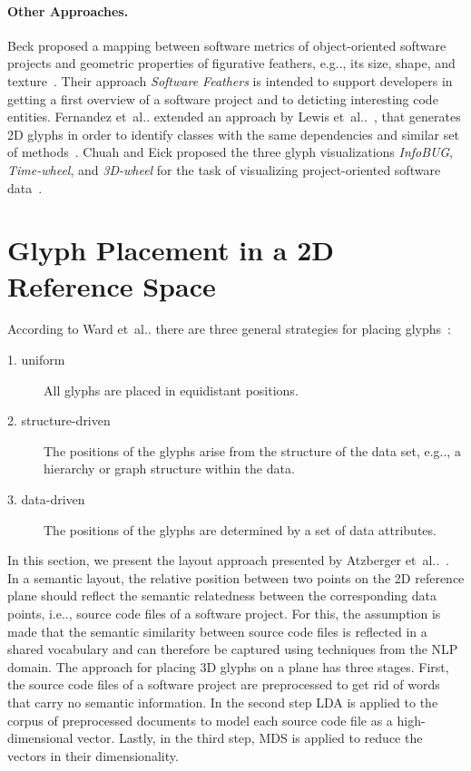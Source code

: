 \documentclass[runningheads]{llncs}
\makeatletter
\DeclareRobustCommand\onedot{\futurelet\@let@token\@onedot}
\def\@onedot{\ifx\@let@token.\else.\null\fi\xspace}
\def\etal{et~al\onedot}
\def\eg{e.g\onedot,\xspace}
\def\ie{i.e\onedot,\xspace}
\makeatother
\begin{document}
\paragraph{Other Approaches.}
Beck proposed a mapping between software metrics of object-oriented software projects and geometric properties of figurative feathers, \eg its size, shape, and texture~\cite{beck2014-feathers}.
Their approach \emph{Software Feathers} is intended to support developers in getting a first overview of a software project and to deticting interesting code entities.
Fernandez \etal extended an approach by Lewis \etal~\cite{Lewis2004VisualIDs}, that generates 2D glyphs in order to identify classes with the same dependencies and similar set of methods~\cite{Fernandez2016Glyphbased}.
Chuah and Eick proposed the three glyph visualizations \textit{InfoBUG}, \textit{Time-wheel}, and \textit{3D-wheel} for the task of visualizing project-oriented software data~\cite{Chuah1997GlyphsSoftwareVisualization}.

\section{Glyph Placement in a 2D Reference Space}
\label{sec:layout}
According to Ward \etal there are three general strategies for placing glyphs~\cite{ward2010interactive}:
\begin{description}
    \item [1. uniform] All glyphs are placed in equidistant positions.
    \item [2. structure-driven] The positions of the glyphs arise from the structure of the data set, \eg a hierarchy or graph structure within the data.
    \item [3. data-driven] The positions of the glyphs are determined by a set of data attributes.
\end{description}
In this section, we present the layout approach presented by Atzberger \etal~\cite{atzberger2021softwareforest}. 
In a semantic layout, the relative position between two points on the 2D reference plane should reflect the semantic relatedness between the corresponding data points, \ie source code files of a software project.
For this, the assumption is made that the semantic similarity between source code files is reflected in a shared vocabulary and can therefore be captured using techniques from the \ac{NLP} domain.
The approach for placing 3D glyphs on a plane has three stages.
First, the source code files of a software project are preprocessed to get rid of words that carry no semantic information.
In the second step \ac{LDA} is applied to the corpus of preprocessed documents to model each source code file as a high-dimensional vector.
Lastly, in the third step, \ac{MDS} is applied to reduce the vectors in their dimensionality.
\end{document}
